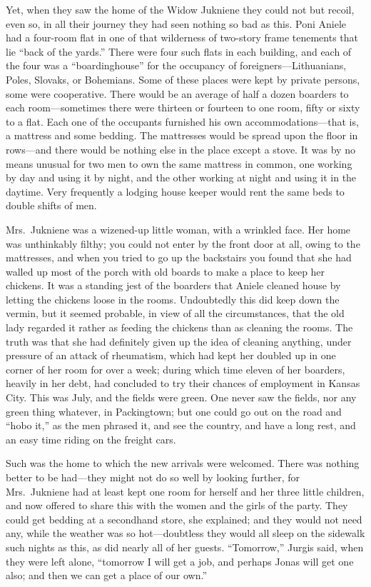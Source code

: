 \documentclass[
]{book}
\theoremstyle{definition}
\theoremstyle{definition}
\theoremstyle{definition}
\theoremstyle{definition}
\theoremstyle{remark}
\begin{document}
Yet, when they saw the home of the Widow Jukniene they could not but recoil, even so, in all their journey they had seen nothing so bad as this. Poni Aniele had a four-room flat in one of that wilderness of two-story frame tenements that lie ``back of the yards.'' There were four such flats in each building, and each of the four was a ``boardinghouse'' for the occupancy of foreigners---Lithuanians, Poles, Slovaks, or Bohemians. Some of these places were kept by private persons, some were cooperative. There would be an average of half a dozen boarders to each room---sometimes there were thirteen or fourteen to one room, fifty or sixty to a flat. Each one of the occupants furnished his own accommodations---that is, a mattress and some bedding. The mattresses would be spread upon the floor in rows---and there would be nothing else in the place except a stove. It was by no means unusual for two men to own the same mattress in common, one working by day and using it by night, and the other working at night and using it in the daytime. Very frequently a lodging house keeper would rent the same beds to double shifts of men.

Mrs.~Jukniene was a wizened-up little woman, with a wrinkled face. Her home was unthinkably filthy; you could not enter by the front door at all, owing to the mattresses, and when you tried to go up the backstairs you found that she had walled up most of the porch with old boards to make a place to keep her chickens. It was a standing jest of the boarders that Aniele cleaned house by letting the chickens loose in the rooms. Undoubtedly this did keep down the vermin, but it seemed probable, in view of all the circumstances, that the old lady regarded it rather as feeding the chickens than as cleaning the rooms. The truth was that she had definitely given up the idea of cleaning anything, under pressure of an attack of rheumatism, which had kept her doubled up in one corner of her room for over a week; during which time eleven of her boarders, heavily in her debt, had concluded to try their chances of employment in Kansas City. This was July, and the fields were green. One never saw the fields, nor any green thing whatever, in Packingtown; but one could go out on the road and ``hobo it,'' as the men phrased it, and see the country, and have a long rest, and an easy time riding on the freight cars.

Such was the home to which the new arrivals were welcomed. There was nothing better to be had---they might not do so well by looking further, for Mrs.~Jukniene had at least kept one room for herself and her three little children, and now offered to share this with the women and the girls of the party. They could get bedding at a secondhand store, she explained; and they would not need any, while the weather was so hot---doubtless they would all sleep on the sidewalk such nights as this, as did nearly all of her guests. ``Tomorrow,'' Jurgis said, when they were left alone, ``tomorrow I will get a job, and perhaps Jonas will get one also; and then we can get a place of our own.''
\end{document}
